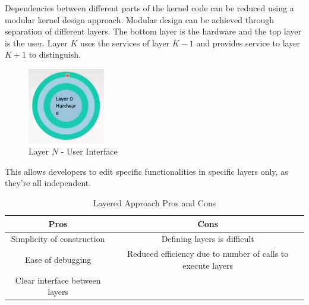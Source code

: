 \documentclass[a4paper]{article}
\theoremstyle{plain}
\theoremstyle{definition}
\newtheorem{defn}{Definition}[section]
\theoremstyle{remark}
\begin{document}
	\begin{tcolorbox}[colback=black!3!white,colframe=black!60!white,title=\begin{defn}Layers \label{Layers}\end{defn}]
	Dependencies between different parts of the kernel code can be reduced using a modular kernel design approach. Modular design can be achieved through separation of different layers. The bottom layer is the hardware and the top layer is the user. Layer $K$ uses the services of layer $K-1$ and provides service to layer $K+1$ to distinguish. 
	\begin{figure}[H]
		\centering
		\includegraphics[width=0.3\textwidth]{two.png}
		\caption{Layer $N$ - User Interface}
		\label{fig:two-png}
	\end{figure}
	This allows developers to edit specific functionalities in specific layers only, as they're all independent.
	\begin{table}[H]
		\centering
		\caption{Layered Approach Pros and Cons}
		\label{tab:laytab}
		\begin{tabular}{|c|c|}
		\hline Pros & Cons \\
		\hline
		Simplicity of construction & Defining layers is difficult \\
		Ease of debugging & Reduced efficiency due to number of calls to execute layers \\
		Clear interface between layers & \\
		\hline
		\end{tabular}
	\end{table}
	\end{tcolorbox}
\end{document}
